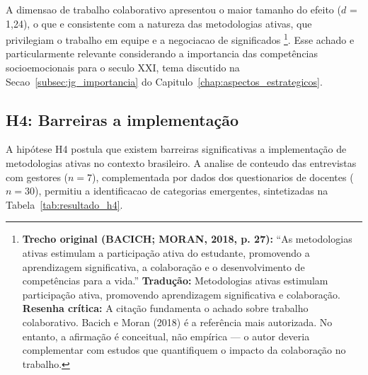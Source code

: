 A dimensao de trabalho colaborativo apresentou o maior tamanho do efeito ($d$ = 1,24), o que e consistente com a natureza das metodologias ativas, que privilegiam o trabalho em equipe e a negociacao de significados \cite{BACICH2018}\footnote{\textbf{Trecho original (BACICH; MORAN, 2018, p. 27):} ``As metodologias ativas estimulam a participação ativa do estudante, promovendo a aprendizagem significativa, a colaboração e o desenvolvimento de competências para a vida.'' \textbf{Tradução:} Metodologias ativas estimulam participação ativa, promovendo aprendizagem significativa e colaboração. \textbf{Resenha crítica:} A citação fundamenta o achado sobre trabalho colaborativo. Bacich e Moran (2018) é a referência mais autorizada. No entanto, a afirmação é conceitual, não empírica — o autor deveria complementar com estudos que quantifiquem o impacto da colaboração no trabalho.}. Esse achado e particularmente relevante considerando a importancia das competências socioemocionais para o seculo XXI, tema discutido na Secao~\ref{subsec:jg_importancia} do Capitulo~\ref{chap:aspectos_estrategicos}.

\subsection{H4: Barreiras a implementação}
\label{subsec:h4_barreiras}

A hipótese H4 postula que existem barreiras significativas a implementação de metodologias ativas no contexto brasileiro. A analise de conteudo das entrevistas com gestores ($n = 7$), complementada por dados dos questionarios de docentes ($n = 30$), permitiu a identificacao de categorias emergentes, sintetizadas na Tabela~\ref{tab:resultado_h4}.

